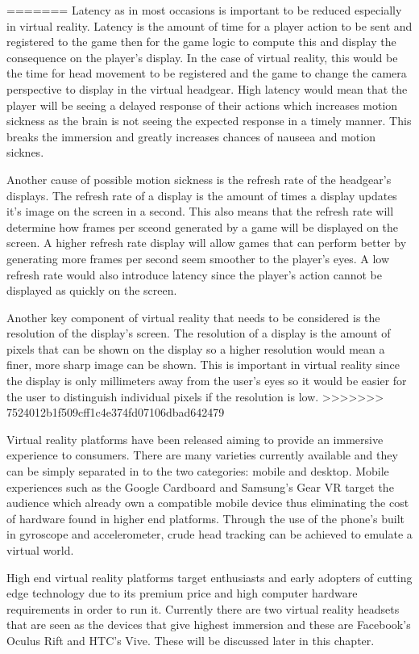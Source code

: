 =======
Latency as in most occasions is important to be reduced especially in virtual reality. Latency is the amount of time for a player action to be sent and registered to the game then for the game logic to compute this and display the consequence on the player's display. In the case of virtual reality, this would be the time for head movement to be registered and  the game to change the camera perspective to display in the virtual headgear. High latency would mean that the player will be seeing a delayed response of their actions which increases motion sickness as the brain is not seeing the expected response in a timely manner. This breaks the immersion and greatly increases chances of nauseea and motion sicknes.
\newline
\par
Another cause of possible motion sickness is the refresh rate of the headgear's displays. The refresh rate of a display is the amount of times a display updates it's image on the screen in a second. This also means that the refresh rate will determine how frames per sceond generated by a game will be displayed on the screen. A higher refresh rate display will allow games that can perform better by generating more frames per second seem smoother to the player's eyes. A low refresh rate would also introduce latency since the player's action cannot be displayed as quickly on the screen.
\newline
\par
Another key component of virtual reality that needs to be considered is the resolution of the display's screen. The resolution of a display is the amount of pixels that can be shown on the display so a higher resolution would mean a finer, more sharp image can be shown. This is important in virtual reality since the display is only millimeters away from the user's eyes so it would be easier for the user to distinguish individual pixels if the resolution is low.
>>>>>>> 7524012b1f509cff1c4e374fd07106dbad642479
\newline
\par
Virtual reality platforms have been released aiming to provide an immersive experience to consumers. There are many varieties currently available and they can be simply separated in to the two categories: mobile and desktop. Mobile experiences such as the Google Cardboard and Samsung's Gear VR target the audience which already own a compatible mobile device thus eliminating the cost of hardware found in higher end platforms. Through the use of the phone's built in gyroscope and accelerometer, crude head tracking can be achieved to emulate a virtual world.
\newline
\par
High end virtual reality platforms target enthusiasts and early adopters of cutting edge technology due to its premium price and high computer hardware requirements in order to run it. Currently there are two virtual reality headsets that are seen as the devices that give highest immersion and these are Facebook's Oculus Rift and HTC's Vive. These will be discussed later in this chapter.

